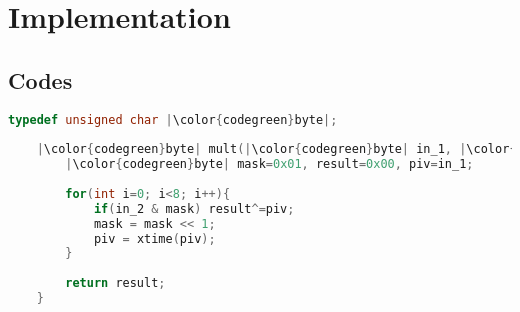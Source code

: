 \section{Implementation}

\subsection{Codes}

\begin{frame}[fragile]
	\begin{lstlisting}[language=C++, caption=Mult example]
	typedef unsigned char |\color{codegreen}byte|; 
	
	|\color{codegreen}byte| mult(|\color{codegreen}byte| in_1, |\color{codegreen}byte| in_2){
		|\color{codegreen}byte| mask=0x01, result=0x00, piv=in_1;
		
		for(int i=0; i<8; i++){
			if(in_2 & mask) result^=piv;
			mask = mask << 1;
			piv = xtime(piv);
		}
		
		return result;
	}\end{lstlisting}
\end{frame}
